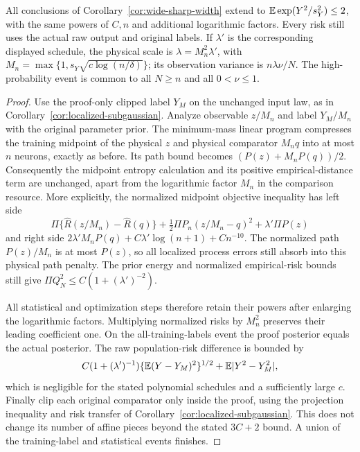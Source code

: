 \begin{corollary}
\label{cor:wide-sharp-subgaussian}
All conclusions of Corollary~\ref{cor:wide-sharp-width} extend to
$\mathbb E\exp(Y^2/s_Y^2)\le2$, with the same powers of $C,n$ and additional
logarithmic factors. Every risk still uses the actual raw output and
original labels. If $\lambda'$ is the corresponding displayed schedule,
the physical scale is $\lambda=M_n^2\lambda'$, with
$M_n=\max\{1,s_Y\sqrt{c\log(n/\delta)}\}$; its observation variance
is $n\lambda\nu/N$. The high-probability event is common to all
$N\ge n$ and all $0<\nu\le1$.
\end{corollary}
\begin{proof}
Use the proof-only clipped label $Y_M$ on the unchanged input law,
as in Corollary~\ref{cor:localized-subgaussian}. Analyze observable
$z/M_n$ and label $Y_M/M_n$ with the original parameter prior.
The minimum-mass linear program compresses the training midpoint
of the physical $z$ and physical comparator $M_nq$ into at most
$n$ neurons, exactly as before. Its path bound becomes
$(P(z)+M_nP(q))/2$. Consequently the midpoint entropy calculation
and its positive empirical-distance term are unchanged, apart from
the logarithmic factor $M_n$ in the comparison resource.
More explicitly, the normalized midpoint objective inequality has
left side
\[
 \Pi\{\widehat R(z/M_n)-\widehat R(q)\}
 +\tfrac12\Pi P_n(z/M_n-q)^2+\lambda'\Pi P(z)
\]
and right side $2\lambda'M_nP(q)+C\lambda'\log(n+1)+Cn^{-10}$.
The normalized path $P(z)/M_n$ is at most $P(z)$, so all localized
process errors still absorb into this physical path penalty.
The prior energy and normalized empirical-risk bounds still give
$\Pi Q_N^2\le C(1+(\lambda')^{-2})$.

All statistical and optimization steps therefore retain their
powers after enlarging the logarithmic factors. Multiplying normalized
risks by $M_n^2$ preserves their leading coefficient one. On the
all-training-labels event the proof posterior equals the actual
posterior. The raw population-risk difference is bounded by
\[
 C(1+(\lambda')^{-1})\{\mathbb E(Y-Y_M)^2\}^{1/2}
       +\mathbb E|Y^2-Y_M^2|,
\]
which is negligible for the stated polynomial schedules and a
sufficiently large $c$. Finally clip each original comparator only
inside the proof, using the projection inequality and risk transfer
of Corollary~\ref{cor:localized-subgaussian}. This does not change
its number of affine pieces beyond the stated $3C+2$ bound.
A union of the training-label and statistical events finishes.
\end{proof}
